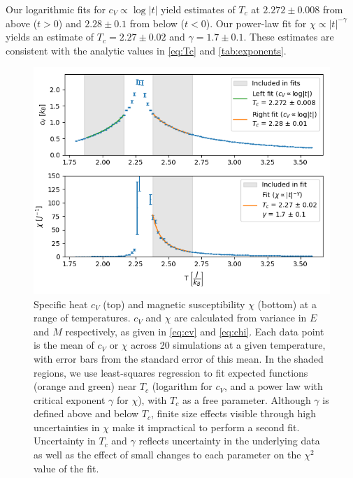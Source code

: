 \documentclass[letter,scriptaddress,twocolumn, prl,nofootinbib]{revtex4}
\begin{document}
Our logarithmic fits for $c_V \propto \log |t|$ yield estimates of $T_c$ at $2.272 \pm 0.008$ from above ($t > 0$) and $2.28 \pm 0.1$ from below ($t < 0$). Our power-law fit for $\chi \propto |t|^{-\gamma}$ yields an estimate of $T_c = 2.27 \pm 0.02$ and $\gamma = 1.7 \pm 0.1$. These estimates are consistent with the analytic values in \autoref{eq:Tc} and \autoref{tab:exponents}.

\begin{figure}[h]
	\begin{center}
		\includegraphics[width=.5\textwidth]{figs/fig3.png}
		\caption{Specific heat $c_V$ (top) and magnetic susceptibility $\chi$ (bottom) at a range of temperatures. $c_V$ and $\chi$ are calculated from variance in $E$ and $M$ respectively, as given in \autoref{eq:cv} and \autoref{eq:chi}. Each data point is the mean of $c_V$ or $\chi$ across 20 simulations at a given temperature, with error bars from the standard error of this mean. In the shaded regions, we use least-squares regression to fit expected functions (orange and green) near $T_c$ (logarithm for $c_V$, and a power law with critical exponent $\gamma$ for $\chi$), with $T_c$ as a free parameter. Although $\gamma$ is defined above and below $T_c$, finite size effects visible through high uncertainties in $\chi$ make it impractical to perform a second fit. Uncertainty in $T_c$ and $\gamma$ reflects uncertainty in the underlying data as well as the effect of small changes to each parameter on the $\chi^2$ value of the fit.}
		\label{fig:fig3}
	\end{center}
\end{figure}
\end{document}
